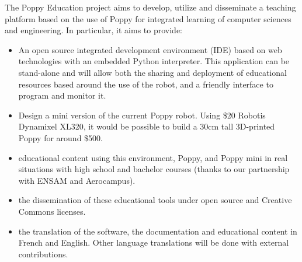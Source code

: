 The Poppy Education project aims to develop, utilize and disseminate a teaching platform based on the use of Poppy for integrated learning of computer sciences and engineering. In particular, it aims to provide:
\begin{itemize}
    \item An open source integrated development environment (IDE) based on web technologies with an embedded Python interpreter. This application can be stand-alone and will allow both the sharing and deployment of educational resources based around the use of the robot, and a friendly interface to program and monitor it.
    \item Design a mini version of the current Poppy robot. Using \$20 Robotis Dynamixel XL320, it would be possible to build a 30cm tall 3D-printed Poppy for around \$500.
    \item educational content using this environment, Poppy, and Poppy mini in real situations with high school and bachelor courses (thanks to our partnership with ENSAM and Aerocampus).
    \item the dissemination of these educational tools under open source and Creative Commons licenses.
    \item the translation of the software, the documentation and educational content in French and English. Other language translations will be done with external contributions.
\end{itemize}
